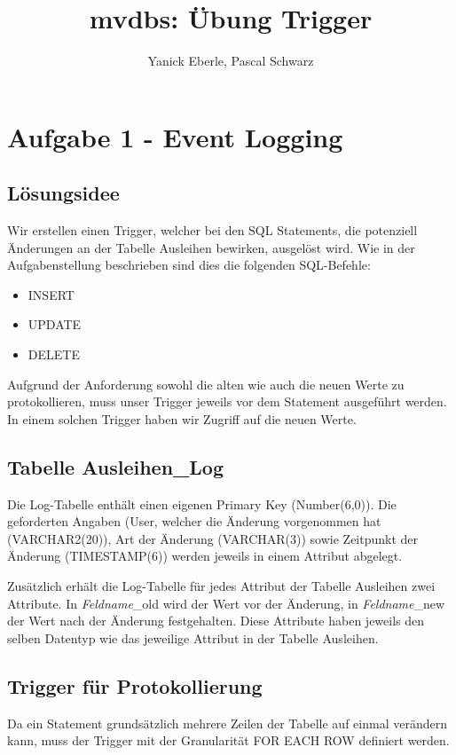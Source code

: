 \documentclass[11pt,a4paper,parskip=half]{scrartcl}
\title{mvdbs: Übung Trigger}
\author{Yanick Eberle, Pascal Schwarz}
\begin{document}
\maketitle

\section{Aufgabe 1 - Event Logging}
\subsection{Lösungsidee}
Wir erstellen einen Trigger, welcher bei den SQL Statements, die potenziell Änderungen an der Tabelle \glqq{}Ausleihen\grqq{} bewirken, ausgelöst wird. Wie in der Aufgabenstellung beschrieben sind dies die folgenden SQL-Befehle:

\begin{itemize}
	\item{INSERT}
	\item{UPDATE}
	\item{DELETE}
\end{itemize}

Aufgrund der Anforderung sowohl die alten wie auch die neuen Werte zu protokollieren, muss unser Trigger jeweils vor dem Statement ausgeführt werden. In einem solchen Trigger haben wir Zugriff auf die neuen Werte.

\subsection{Tabelle Ausleihen\_Log}
Die Log-Tabelle enthält einen eigenen Primary Key (Number(6,0)). Die geforderten Angaben (User, welcher die Änderung vorgenommen hat (VARCHAR2(20)), Art der Änderung (VARCHAR(3)) sowie Zeitpunkt der Änderung (TIMESTAMP(6)) werden jeweils in einem Attribut abgelegt.

Zusätzlich erhält die Log-Tabelle für jedes Attribut der Tabelle Ausleihen zwei Attribute. In \emph{Feldname}\_old wird der Wert vor der Änderung, in \emph{Feldname}\_new der Wert nach der Änderung festgehalten. Diese Attribute haben jeweils den selben Datentyp wie das jeweilige Attribut in der Tabelle \glqq{}Ausleihen\grqq{}.

\subsection{Trigger für Protokollierung}
Da ein Statement grundsätzlich mehrere Zeilen der Tabelle \glqq{}auf einmal\grqq{} verändern kann, muss der Trigger mit der Granularität \glqq{}FOR EACH ROW\grqq{} definiert werden.
\end{document}
